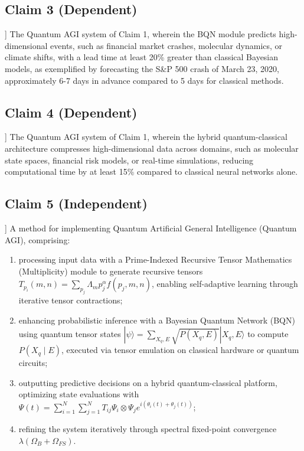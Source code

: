 \documentclass[12pt]{article}
\begin{document}
\begin{enumerate}
    \subsection{Claim 3 (Dependent)}] The Quantum AGI system of Claim 1, wherein the BQN module predicts high-dimensional events, such as financial market crashes, molecular dynamics, or climate shifts, with a lead time at least 20\% greater than classical Bayesian models, as exemplified by forecasting the S&P 500 crash of March 23, 2020, approximately 6-7 days in advance compared to 5 days for classical methods.

    \subsection{Claim 4 (Dependent)}] The Quantum AGI system of Claim 1, wherein the hybrid quantum-classical architecture compresses high-dimensional data across domains, such as molecular state spaces, financial risk models, or real-time simulations, reducing computational time by at least 15\% compared to classical neural networks alone.

    \subsection{Claim 5 (Independent)}] A method for implementing Quantum Artificial General Intelligence (Quantum AGI), comprising:
    \begin{enumerate}
        \item[(a)] processing input data with a Prime-Indexed Recursive Tensor Mathematics (Multiplicity) module to generate recursive tensors \( T_{p_i}(m, n) = \sum_{p_j} \Lambda_m p_j^\alpha f(p_j, m, n) \), enabling self-adaptive learning through iterative tensor contractions;
        \item[(b)] enhancing probabilistic inference with a Bayesian Quantum Network (BQN) using quantum tensor states \( |\psi\rangle = \sum_{X_q, E} \sqrt{P(X_q, E)} |X_q, E\rangle \) to compute \( P(X_q \mid E) \), executed via tensor emulation on classical hardware or quantum circuits;
        \item[(c)] outputting predictive decisions on a hybrid quantum-classical platform, optimizing state evaluations with \( \Psi(t) = \sum_{i=1}^N \sum_{j=1}^N T_{ij} \Psi_i \otimes \Psi_j e^{i(\theta_i(t) + \theta_j(t))} \);
        \item[(d)] refining the system iteratively through spectral fixed-point convergence \( \lambda (\Omega_B + \Omega_{FS}) \).
    \end{enumerate}


\end{enumerate}
\end{document}

